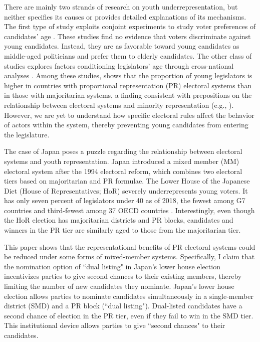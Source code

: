 \documentclass[a4paper, 11pt]{article}
\begin{document}
There are mainly two strands of research on youth underrepresentation, but neither specifies its causes or provides detailed explanations of its mechanisms. The first type of study exploits conjoint experiments to study voter preferences of candidates' age \citep{eshima2022just, horiuchi2020identifying, mcclean_too_2024}. These studies find no evidence that voters discriminate against young candidates. Instead, they are as favorable toward young candidates as middle-aged politicians and prefer them to elderly candidates. The other class of studies explores factors conditioning legislators' age through cross-national analyses \citep{joshi2013representation, stockemer2018age, stockemer_youth_2022, stockemer_age_2023}. 
Among these studies, \citet{joshi2013representation} shows that the proportion of young legislators is higher in countries with proportional representation (PR) electoral systems than in those with majoritarian systems, a finding consistent with prepositions on the relationship between electoral systems and minority representation (e.g., \citet{norris_electoral_2004}). However, we are yet to understand how specific electoral rules affect the behavior of actors within the system, thereby preventing young candidates from entering the legislature. 

The case of Japan poses a puzzle regarding the relationship between electoral systems and youth representation. Japan introduced a mixed member (MM) electoral system after the 1994 electoral reform, which combines two electoral tiers based on majoritarian and PR formulae. The Lower House of the Japanese Diet (House of Representatives; HoR) severely underrepresents young voters. It has only seven percent of legislators under 40 as of 2018, the fewest among G7 countries and third-fewest among 37 OECD countries \citep{mcclean2020thesis}. Interestingly, even though the HoR election has majoritarian districts and PR blocks, candidates and winners in the PR tier are similarly aged to those from the majoritarian tier. 

This paper shows that the representational benefits of PR electoral systems could be reduced under some forms of mixed-member systems. Specifically, I claim that the nomination option of ``dual listing" in Japan's lower house election incentivizes parties to give second chances to their existing members, thereby limiting the number of new candidates they nominate. Japan's lower house election allows parties to nominate candidates simultaneously in a single-member district (SMD) and a PR block (``dual listing"). Dual-listed candidates have a second chance of election in the PR tier, even if they fail to win in the SMD tier. This institutional device allows parties to give ``second chances" to their candidates. 
\end{document}
